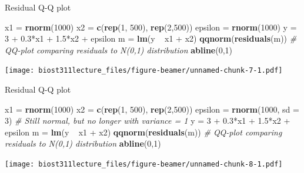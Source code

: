 \documentclass[12pt,ignorenonframetext,]{beamer}
\newenvironment{Shaded}{\begin{snugshade}}{\end{snugshade}}
\newcommand{\KeywordTok}[1]{\textcolor[rgb]{0.13,0.29,0.53}{\textbf{{#1}}}}
\newcommand{\DataTypeTok}[1]{\textcolor[rgb]{0.13,0.29,0.53}{{#1}}}
\newcommand{\DecValTok}[1]{\textcolor[rgb]{0.00,0.00,0.81}{{#1}}}
\newcommand{\FloatTok}[1]{\textcolor[rgb]{0.00,0.00,0.81}{{#1}}}
\newcommand{\StringTok}[1]{\textcolor[rgb]{0.31,0.60,0.02}{{#1}}}
\newcommand{\CommentTok}[1]{\textcolor[rgb]{0.56,0.35,0.01}{\textit{{#1}}}}
\newcommand{\NormalTok}[1]{{#1}}
\begin{document}
\begin{frame}[fragile]{Residual Q-Q plot}

\tiny

\begin{Shaded}
\begin{Highlighting}[]
\NormalTok{x1 =}\StringTok{ }\KeywordTok{rnorm}\NormalTok{(}\DecValTok{1000}\NormalTok{)}
\NormalTok{x2 =}\StringTok{ }\KeywordTok{c}\NormalTok{(}\KeywordTok{rep}\NormalTok{(}\DecValTok{1}\NormalTok{, }\DecValTok{500}\NormalTok{), }\KeywordTok{rep}\NormalTok{(}\DecValTok{2}\NormalTok{,}\DecValTok{500}\NormalTok{))}
\NormalTok{epsilon =}\StringTok{ }\KeywordTok{rnorm}\NormalTok{(}\DecValTok{1000}\NormalTok{)}
\NormalTok{y =}\StringTok{ }\DecValTok{3} \NormalTok{+}\StringTok{ }\FloatTok{0.3}\NormalTok{*x1 +}\StringTok{ }\FloatTok{1.5}\NormalTok{*x2 +}\StringTok{ }\NormalTok{epsilon}
\NormalTok{m =}\StringTok{ }\KeywordTok{lm}\NormalTok{(y ~}\StringTok{ }\NormalTok{x1 +}\StringTok{ }\NormalTok{x2)}
\KeywordTok{qqnorm}\NormalTok{(}\KeywordTok{residuals}\NormalTok{(m)) }\CommentTok{# QQ-plot comparing residuals to N(0,1) distribution}
\KeywordTok{abline}\NormalTok{(}\DecValTok{0}\NormalTok{,}\DecValTok{1}\NormalTok{)}
\end{Highlighting}
\end{Shaded}

\texttt{[image: biost311lecture\_files/figure-beamer/unnamed-chunk-7-1.pdf]}

\normalsize

\end{frame}

\begin{frame}[fragile]{Residual Q-Q plot}

\tiny

\begin{Shaded}
\begin{Highlighting}[]
\NormalTok{x1 =}\StringTok{ }\KeywordTok{rnorm}\NormalTok{(}\DecValTok{1000}\NormalTok{)}
\NormalTok{x2 =}\StringTok{ }\KeywordTok{c}\NormalTok{(}\KeywordTok{rep}\NormalTok{(}\DecValTok{1}\NormalTok{, }\DecValTok{500}\NormalTok{), }\KeywordTok{rep}\NormalTok{(}\DecValTok{2}\NormalTok{,}\DecValTok{500}\NormalTok{))}
\NormalTok{epsilon =}\StringTok{ }\KeywordTok{rnorm}\NormalTok{(}\DecValTok{1000}\NormalTok{, }\DataTypeTok{sd =} \DecValTok{3}\NormalTok{) }\CommentTok{# Still normal, but no longer with variance = 1}
\NormalTok{y =}\StringTok{ }\DecValTok{3} \NormalTok{+}\StringTok{ }\FloatTok{0.3}\NormalTok{*x1 +}\StringTok{ }\FloatTok{1.5}\NormalTok{*x2 +}\StringTok{ }\NormalTok{epsilon}
\NormalTok{m =}\StringTok{ }\KeywordTok{lm}\NormalTok{(y ~}\StringTok{ }\NormalTok{x1 +}\StringTok{ }\NormalTok{x2)}
\KeywordTok{qqnorm}\NormalTok{(}\KeywordTok{residuals}\NormalTok{(m)) }\CommentTok{# QQ-plot comparing residuals to N(0,1) distribution}
\KeywordTok{abline}\NormalTok{(}\DecValTok{0}\NormalTok{,}\DecValTok{1}\NormalTok{)}
\end{Highlighting}
\end{Shaded}

\texttt{[image: biost311lecture\_files/figure-beamer/unnamed-chunk-8-1.pdf]}

\normalsize

\end{frame}
\end{document}
